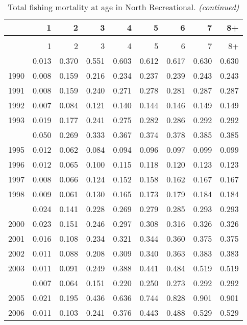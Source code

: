 \documentclass[
]{article}
\begin{document}
\begin{longtable}[t]{lrrrrrrrr}
\caption{\label{tab:North_Recreational-fleet-FAA-table}Total fishing mortality at age in North Recreational.}\\
\toprule
  & 1 & 2 & 3 & 4 & 5 & 6 & 7 & 8+\\
\midrule
\endfirsthead
\caption[]{Total fishing mortality at age in North Recreational. \textit{(continued)}}\\
\toprule
  & 1 & 2 & 3 & 4 & 5 & 6 & 7 & 8+\\
\midrule
\endhead

\endfoot
\bottomrule
\endlastfoot
1989 & 0.013 & 0.370 & 0.551 & 0.603 & 0.612 & 0.617 & 0.630 & 0.630\\
1990 & 0.008 & 0.159 & 0.216 & 0.234 & 0.237 & 0.239 & 0.243 & 0.243\\
1991 & 0.008 & 0.159 & 0.240 & 0.271 & 0.278 & 0.281 & 0.287 & 0.287\\
1992 & 0.007 & 0.084 & 0.121 & 0.140 & 0.144 & 0.146 & 0.149 & 0.149\\
1993 & 0.019 & 0.177 & 0.241 & 0.275 & 0.282 & 0.286 & 0.292 & 0.292\\
\addlinespace
1994 & 0.050 & 0.269 & 0.333 & 0.367 & 0.374 & 0.378 & 0.385 & 0.385\\
1995 & 0.012 & 0.062 & 0.084 & 0.094 & 0.096 & 0.097 & 0.099 & 0.099\\
1996 & 0.012 & 0.065 & 0.100 & 0.115 & 0.118 & 0.120 & 0.123 & 0.123\\
1997 & 0.008 & 0.066 & 0.124 & 0.152 & 0.158 & 0.162 & 0.167 & 0.167\\
1998 & 0.009 & 0.061 & 0.130 & 0.165 & 0.173 & 0.179 & 0.184 & 0.184\\
\addlinespace
1999 & 0.024 & 0.141 & 0.228 & 0.269 & 0.279 & 0.285 & 0.293 & 0.293\\
2000 & 0.023 & 0.151 & 0.246 & 0.297 & 0.308 & 0.316 & 0.326 & 0.326\\
2001 & 0.016 & 0.108 & 0.234 & 0.321 & 0.344 & 0.360 & 0.375 & 0.375\\
2002 & 0.011 & 0.088 & 0.208 & 0.309 & 0.340 & 0.363 & 0.383 & 0.383\\
2003 & 0.011 & 0.091 & 0.249 & 0.388 & 0.441 & 0.484 & 0.519 & 0.519\\
\addlinespace
2004 & 0.007 & 0.064 & 0.151 & 0.220 & 0.250 & 0.273 & 0.292 & 0.292\\
2005 & 0.021 & 0.195 & 0.436 & 0.636 & 0.744 & 0.828 & 0.901 & 0.901\\
2006 & 0.011 & 0.103 & 0.241 & 0.376 & 0.443 & 0.488 & 0.529 & 0.529\\

\end{longtable}
\end{document}
